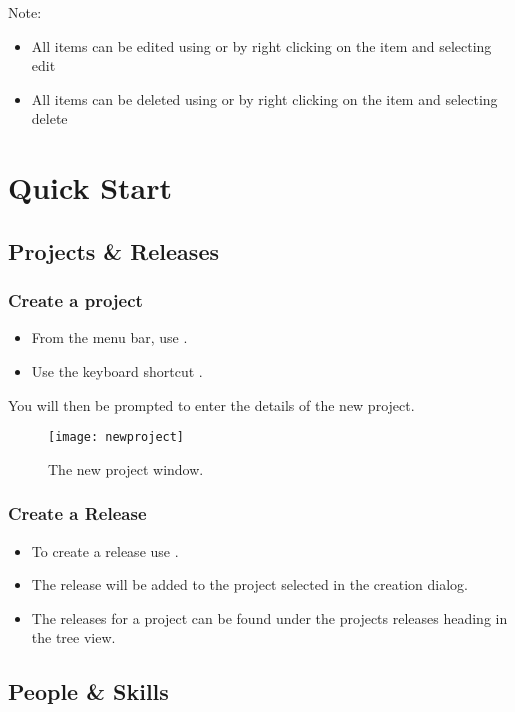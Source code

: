 \documentclass[11pt,fleqn]{book} %
\begin{document}
Note:
\begin{itemize}
    \item All items can be edited using  or by right clicking on the item and selecting edit
    \item All items can be deleted using  or by right clicking on the item and selecting delete
\end{itemize}

\section{Quick Start}
\subsection{Projects \& Releases}
\subsubsection{Create a project}
    \begin{itemize}
        \item From the menu bar, use .
        \item Use the keyboard shortcut .
    \end{itemize}
    You will then be prompted to enter the details of the new project.

    \begin{figure}[h]
        \centering
        \texttt{[image: newproject]}
        \caption{The new project window.\label{newproject}}
    \end{figure}

\subsubsection{Create a Release}
    \begin{itemize}
        \item To create a release use .
        \item The release will be added to the project selected in the creation dialog.
        \item The releases for a project can be found under the projects releases heading in the tree view.
    \end{itemize}

\subsection{People \& Skills}
\end{document}
